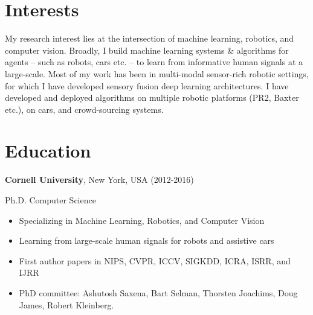 \documentclass[line,margin]{res}
\begin{document}
 

\address{142 Gates Building, Stanford University, CA 94305}
\address{ashesh@cs.cornell.edu, \url{www.cs.cornell.edu/~ashesh}}



\begin{resume} 
 

\section{Interests}
My research interest lies at the intersection of machine learning, robotics, and computer vision. Broadly, I build machine learning systems \& algorithms for agents -- such as robots, cars etc. -- to learn from informative human signals at a large-scale. Most of my work has been in multi-modal sensor-rich robotic settings, for which I have developed sensory fusion deep learning architectures. I have developed and deployed algorithms on multiple robotic platforms (PR2, Baxter etc.), on cars, and crowd-sourcing systems.

 
\iffalse

for humans to help machines -- such as robots, cars etc. -- become smart by implicitly providing
learning signals. I am particularly interested in learning from signals that are easy to
elicit at large-scale but are inherently weak and noisy. I am recently
exploiting the potential of crowd-sourcing feedback to teach robots good trajectories in
context-rich environments and using vision based human feedback for
assistive cars. 
\fi
\section{Education} 
 
{\bf Cornell University}, New York, USA  \hfill (2012-2016)
 
 \vspace{-4mm}
  \hspace {4mm } Ph.D. Computer Science 
 \begin{itemize} \itemsep -2pt  %
 \item Specializing in Machine Learning, Robotics, and Computer Vision
 \item Learning from large-scale human signals for robots and assistive cars
  \item First author papers in NIPS, CVPR, ICCV, SIGKDD, ICRA, ISRR, and IJRR
   \item PhD committee: Ashutosh Saxena, Bart Selman, Thorsten Joachims, Doug James,
Robert Kleinberg.
 \end{itemize}
 


\end{resume}
\end{document}
